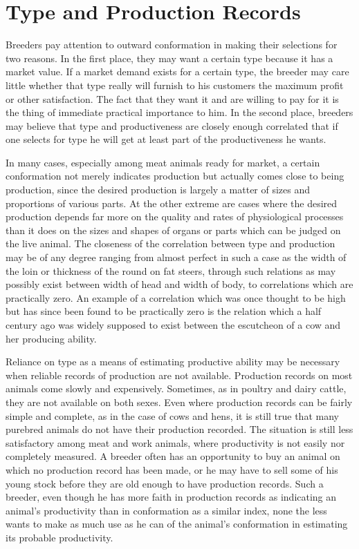\chapter{Type and Production Records}
\label{cha:Lush_Chapter_17}

Breeders pay attention to outward conformation in making their
selections for two reasons. In the first place, they may want a certain
type because it has a market value. If a market demand exists for a certain
type, the breeder may care little whether that type really will furnish
to his customers the maximum profit or other satisfaction. The fact
that they want it and are willing to pay for it is the thing of immediate
practical importance to him. In the second place, breeders may believe
that type and productiveness are closely enough correlated that if one
selects for type he will get at least part of the productiveness he wants.

In many cases, especially among meat animals ready for market, a
certain conformation not merely indicates production but actually
comes close to being production, since the desired production is largely
a matter of sizes and proportions of various parts. At the other extreme
are cases where the desired production depends far more on the quality
and rates of physiological processes than it does on the sizes and shapes
of organs or parts which can be judged on the live animal. The closeness
of the correlation between type and production may be of any
degree ranging from almost perfect in such a case as the width of the
loin or thickness of the round on fat steers, through such relations as
may possibly exist between width of head and width of body, to correlations
which are practically zero. An example of a correlation which was
once thought to be high but has since been found to be practically zero
is the relation which a half century ago was widely supposed to exist
between the escutcheon of a cow and her producing ability.

Reliance on type as a means of estimating productive ability may
be necessary when reliable records of production are not available.
Production records on most animals come slowly and expensively.
Sometimes, as in poultry and dairy cattle, they are not available on both
sexes. Even where production records can be fairly simple and complete,
as in the case of cows and hens, it is still true that many purebred
animals do not have their production recorded. The situation is still
less satisfactory among meat and work animals, where productivity is
not easily nor completely measured. A breeder often has an opportunity
to buy an animal on which no production record has been made, or he
may have to sell some of his young stock before they are old enough
to have production records. Such a breeder, even though he has more
faith in production records as indicating an animal's productivity than
in conformation as a similar index, none the less wants to make as much
use as he can of the animal's conformation in estimating its probable
productivity.

